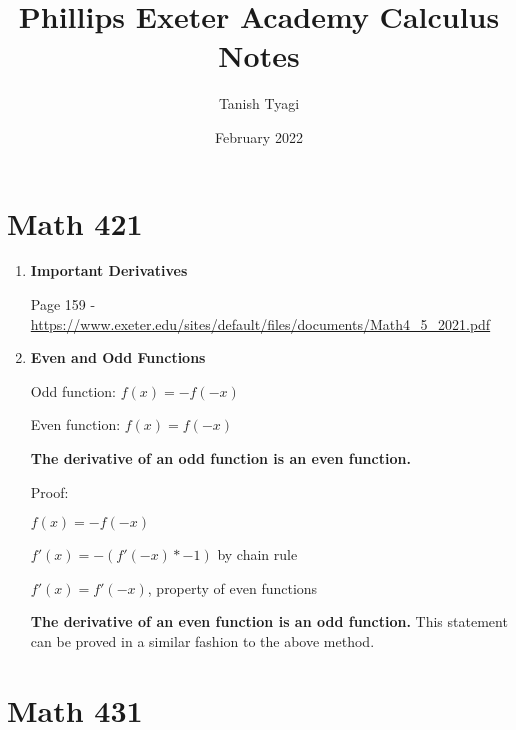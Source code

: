 \documentclass{article}
\title{Phillips Exeter Academy Calculus Notes}
\author{Tanish Tyagi}
\date{February 2022}
\begin{document}
\maketitle

\section{Math 421}

\begin{enumerate}
    \item \textbf{Important Derivatives}
    
    Page 159 - \url{https://www.exeter.edu/sites/default/files/documents/Math4_5_2021.pdf}
    
    \item \textbf{Even and Odd Functions}
    
    Odd function: $f(x) = -f(-x)$
    
    Even function: $f(x) = f(-x)$
    
    \textbf{The derivative of an odd function is an even function.}
    
    Proof:

    $f(x) = -f(-x)$ 
    
    $f'(x) = -(f'(-x) * -1)$ by chain rule
    
    $f'(x) = f'(-x)$, property of even functions
    
    \textbf{The derivative of an even function is an odd function.} This statement can be proved in a similar fashion to the above method. 

\end{enumerate}

\section{Math 431}
\end{document}
